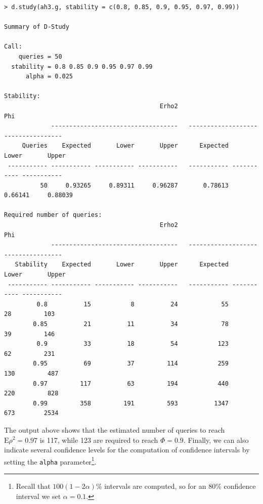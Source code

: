 \documentclass[twoside]{article}
\begin{document}
{\small\begin{verbatim}
> d.study(ah3.g, stability = c(0.8, 0.85, 0.9, 0.95, 0.97, 0.99))

Summary of D-Study

Call:
    queries = 50 
  stability = 0.8 0.85 0.9 0.95 0.97 0.99 
      alpha = 0.025 

Stability:
                                           Erho2                                   Phi
             -----------------------------------   -----------------------------------
     Queries    Expected       Lower       Upper      Expected       Lower       Upper
 ----------- ----------- ----------- -----------   ----------- ----------- -----------
          50     0.93265     0.89311     0.96287       0.78613     0.66141     0.88039 

Required number of queries:
                                           Erho2                                   Phi
             -----------------------------------   -----------------------------------
   Stability    Expected       Lower       Upper      Expected       Lower       Upper
 ----------- ----------- ----------- -----------   ----------- ----------- -----------
         0.8          15           8          24            55          28         103 
        0.85          21          11          34            78          39         146 
         0.9          33          18          54           123          62         231 
        0.95          69          37         114           259         130         487 
        0.97         117          63         194           440         220         828 
        0.99         358         191         593          1347         673        2534
\end{verbatim}}

The output above shows that the estimated number of queries to reach $\text{E}\rho^2=0.97$ is 117, while 123 are required to reach $\Phi=0.9$.
Finally, we can also indicate several confidence levels for the computation of confidence intervals by setting the \texttt{alpha} parameter\footnote{Recall that $100(1-2\alpha)\%$ intervals are computed, so for an 80\% confidence interval we set $\alpha=0.1$.}.
\end{document}
